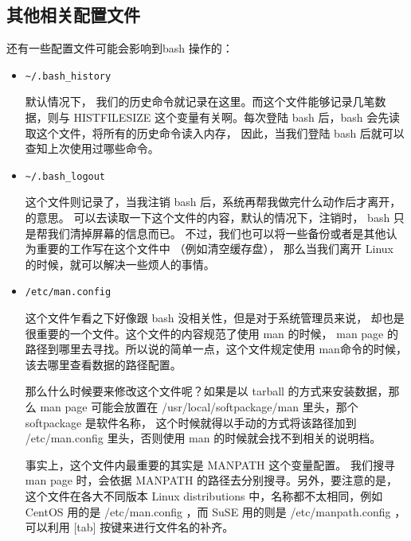 \subsection{其他相关配置文件}
还有一些配置文件可能会影响到bash 操作的：
\begin{itemize}
\item \verb|~/.bash_history|

\qquad 默认情况下， 我们的历史命令就记录在这里。而这个文件能够记录几笔数据，则与 HISTFILESIZE 这个变量有关啊。每次登陆 bash 后，bash 会先读取这个文件，将所有的历史命令读入内存， 因此，当我们登陆 bash 后就可以查知上次使用过哪些命令。

\item \verb|~/.bash_logout|

\qquad 这个文件则记录了，当我注销 bash 后，系统再帮我做完什么动作后才离开，的意思。 可以去读取一下这个文件的内容，默认的情况下，注销时， bash 只是帮我们清掉屏幕的信息而已。 不过，我们也可以将一些备份或者是其他认为重要的工作写在这个文件中 （例如清空缓存盘）， 那么当我们离开 Linux 的时候，就可以解决一些烦人的事情。

\item \verb|/etc/man.config|

\qquad 这个文件乍看之下好像跟 bash 没相关性，但是对于系统管理员来说， 却也是很重要的一个文件。这个文件的内容规范了使用 man 的时候， man page 的路径到哪里去寻找。所以说的简单一点，这个文件规定使用 man命令的时候，该去哪里查看数据的路径配置。

\qquad 那么什么时候要来修改这个文件呢？如果是以 tarball 的方式来安装数据，那么 man page 可能会放置在 /usr/local/softpackage/man 里头，那个 softpackage 是软件名称， 这个时候就得以手动的方式将该路径加到 /etc/man.config 里头，否则使用 man 的时候就会找不到相关的说明档。

\qquad 事实上，这个文件内最重要的其实是 MANPATH 这个变量配置。 我们搜寻 man page 时，会依据 MANPATH 的路径去分别搜寻。另外，要注意的是， 这个文件在各大不同版本 Linux distributions 中，名称都不太相同，例如 CentOS 用的是 /etc/man.config ，而 SuSE 用的则是 /etc/manpath.config ， 可以利用 [tab] 按键来进行文件名的补齐。
\end{itemize}


